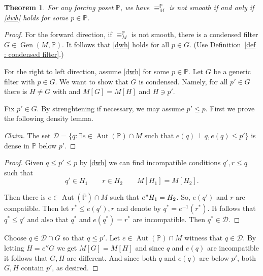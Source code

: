 \documentclass{amsart}
\newcommand{\Gen}{\operatorname{Gen}}
\DeclareMathOperator{\Aut}{Aut}
\newtheorem{theorem}{Theorem}[section]
\theoremstyle{definition}
\theoremstyle{remark}
\begin{document}
\begin{theorem}
\label{lemma : dagger}
For any forcing poset \(\mathbb{P}\), we have $\equiv_{M}^\mathbb{P}$ is not smooth if and only if \eqref{dwh} holds for some $p\in \mathbb{P}$.

\end{theorem}
\begin{proof}
For the forward direction,  if $\equiv_{M}^\mathbb{P}$ is not smooth, there is a condensed filter \(G\in\Gen(M,\mathbb{P})\). It follows that \eqref{dwh} holds for all $p\in G$. (Use Definition~\ref{def : condensed filter}.)

For the right to left direction,
assume \eqref{dwh} for some \(p\in\mathbb{P}\).  Let $G$ be a generic filter with $p\in G$.  We want to show that $G$ is condensed.   Namely,  for all \(p'\in G\) there is \(H\neq G\) with  and \(M[G] = M[H]\) and \(H \ni p'\).

Fix \(p'\in G\). By strenghtening if necessary, we may assume $p'\leq p$. First we prove the following density lemma.
\begin{proof}[Claim]
The set \(\mathcal{D} = \{ q : \exists e \in \Aut(\mathbb{P})\cap M\text{ such that }e(q) \perp q, e(q)\leq p' \}\) is dense in \(\mathbb{P}\) below  \(p'\).
\renewcommand{\qed}{}
\end{proof}
\begin{proof}
Given \(q\leq p' \leq p\) by \eqref{dwh} we can find incompatible conditions \(q', r\leq q\) such that
\[
q'\in H_1 \quad\quad r\in H_2 \quad\quad M[H_1] = M[H_2].
\]

Then there is \(e\in \Aut(\bar{\mathbb{P}})\cap M\) such that $e"H_1=H_2$. So, \(e(q')\) and \(r\) are compatible. Then let \(r^* \leq e(q'), r\) and denote by \(q^* = e^{-1}(r^*)\). It follows that \(q^*\leq q'\) and also that \(q^* \) and \(e(q^*)=r^*\) are incompatible. Then $q^*\in \mathcal{D}$.
\end{proof}

Choose \(q\in\mathcal{D}\cap G\) so that \(q\leq p'\).  Let \(e\in \Aut(\mathbb{P})\cap M\) witness that \(q\in\mathcal{D}\). By letting \(H = e'' G\) we get \(M[G] = M[H]\) and since \(q\) and \(e(q)\) are incompatible it follows that \(G,H\) are different. And since both \(q\) and \(e(q)\) are below $p'$, both $G,H$ contain $p'$, as desired.
\end{proof}
\end{document}
